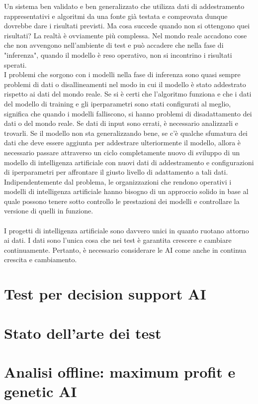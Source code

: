 \documentclass[a4paper,12pt]{report}
\begin{document}
Un sistema ben validato e ben generalizzato che utilizza dati di addestramento rappresentativi e algoritmi da una fonte già testata e comprovata dunque dovrebbe dare i risultati previsti. Ma cosa succede quando non si ottengono quei risultati? La realtà è ovviamente più complessa. Nel mondo reale accadono cose che non avvengono nell'ambiente di test e può accadere che nella fase di "inferenza", quando il modello è reso operativo, non si incontrino i risultati sperati.\\
I problemi che sorgono con i modelli nella fase di inferenza sono quasi sempre problemi di dati o disallineamenti nel modo in cui il modello è stato addestrato rispetto ai dati del mondo reale. Se si è certi che l'algoritmo funziona e che i dati del modello di training e gli iperparametri sono stati configurati al meglio, significa che quando i modelli falliscono, si hanno problemi di disadattamento dei dati o del mondo reale. Se dati di input sono errati, è necessario analizzarli e trovarli. Se il modello non sta generalizzando bene, se c'è qualche sfumatura dei dati che deve essere aggiunta per addestrare ulteriormente il modello, allora è necessario passare attraverso un ciclo completamente nuovo di sviluppo di un modello di intelligenza artificiale con nuovi dati di addestramento e configurazioni di iperparametri per affrontare il giusto livello di adattamento a tali dati. Indipendentemente dal problema, le organizzazioni che rendono operativi i modelli di intelligenza artificiale hanno bisogno di un approccio solido in base al quale possono tenere sotto controllo le prestazioni dei modelli e controllare la versione di quelli in funzione.\\~\\

I progetti di intelligenza artificiale sono davvero unici in quanto ruotano attorno ai dati. I dati sono l'unica cosa che nei test è garantita crescere e cambiare continuamente. Pertanto, è necessario considerare le AI come anche in continua crescita e cambiamento.




\section{Test per decision support AI}

\section{Stato dell'arte dei test}
\section{Analisi offline: maximum profit e genetic AI}
\end{document}
